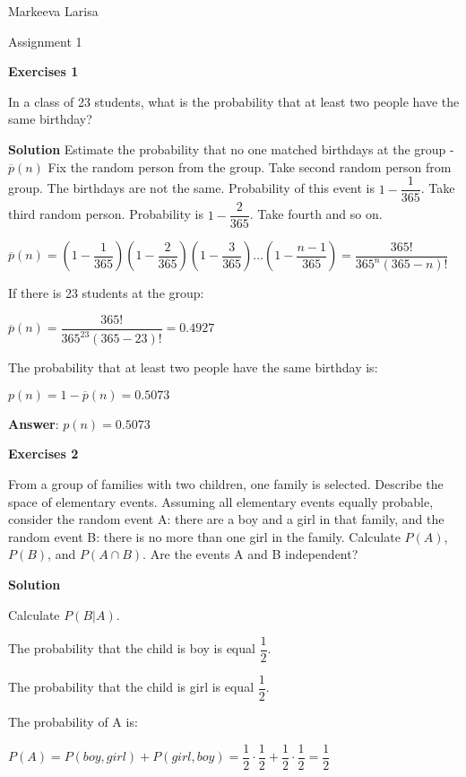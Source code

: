 \documentclass[12pt]{article}
\theoremstyle{definiton}
\theoremstyle{definition}
\theoremstyle{definition}
\begin{document}
	Markeeva Larisa
	
	
	\centerline{\LARGE Assignment 1}

	\bigskip
	
		\textbf{Exercises 1}		
		
		In a class of 23 students, what is the probability that at least two people have the same
birthday?
		\medskip
		
		\textbf{Solution}
		Estimate the probability that no one matched birthdays at the group - $\overline{p}(n)$ Fix the random person from the group. Take second random person from group. The birthdays are not the same. Probability of this event is $1 - \dfrac{1}{365}$. Take third random person. Probability	is $1 - \dfrac{2}{365}$. Take fourth and so on.			
		
		$\overline{p}\left(n\right) = \left(1-\dfrac{1}{365}\right)\left(1-\dfrac{2}{365}\right)\left(1-\dfrac{3}{365}\right)\ldots\left(1-\dfrac{n-1}{365}\right)=\dfrac{365!}{365^n\left(365-n\right)!}$
		
		If there is 23 students at the group:
		
		$\overline{p}\left(n\right) = \dfrac{365!}{365^{23}\left(365-23\right)!}=0.4927$
		
		The probability that at least two people have the same birthday is:
	
		$p\left(n\right)=1-\overline{p}\left(n\right)=0.5073$
		
		\medskip
		\textbf{Answer}: $p\left(n\right)=0.5073$
		
		
		\bigskip
		\textbf{Exercises 2}		
		
		From a group of families with two children, one family is selected. Describe the space of elementary events. Assuming all elementary events equally probable, consider the random event A: there are a boy and a girl in that family, and the random event B: there is no more than one girl in the family. Calculate $P\left(A\right)$, $P\left(B\right)$, and $P\left(A \cap B\right)$. Are the events A and B independent?
		\medskip
		
		\textbf{Solution}
		
		Calculate $P\left(B|A\right)$. 

		The probability that the child is boy is equal $\dfrac{1}{2}$.
	
		The probability that the child is girl is equal $\dfrac{1}{2}$.
		
		The probability of A is:
		
		$P\left(A\right) = P\left(boy, girl\right) + P\left(girl, boy\right)= \dfrac{1}{2}\cdot\dfrac{1}{2} + \dfrac{1}{2}\cdot\dfrac{1}{2} = \dfrac{1}{2}$
		
\end{document}
